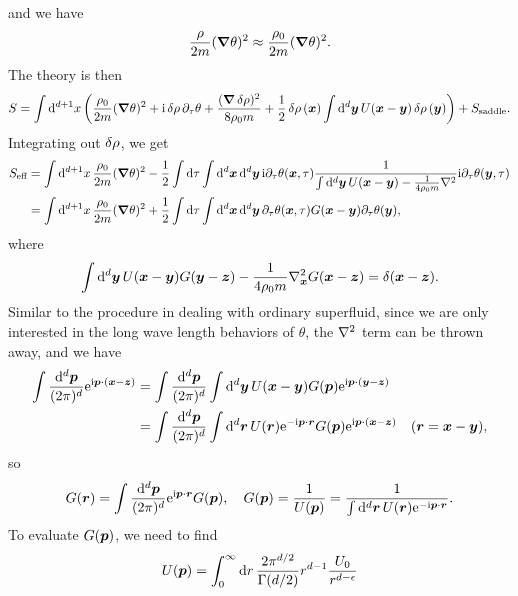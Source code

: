 \documentclass[hyperref, a4paper]{article}
\newcommand*{\ii}{\mathrm{i}}
\newcommand*{\ee}{\mathrm{e}}
\begin{document}
\begin{itemize}
and we have 
\[
    \frac{\rho}{2m} (\grad{\theta})^2 \approx \frac{\rho_0}{2m} (\grad{\theta})^2.
\]
The theory is then 
\begin{equation}
    S = \int \dd[d+1]{x} \left(
        \frac{\rho_0}{2m} (\grad{\theta})^2 
        + \ii \var{\rho} \partial_\tau \theta  
        + \frac{(\grad{\var{\rho}})^2}{8 \rho_0 m} 
        + \frac{1}{2} \var{\rho}(\vb*{x}) \int \dd[d]{\vb*{y}} U(\vb*{x} - \vb*{y}) \var{\rho}(\vb*{y})
    \right) + S_{\text{saddle}}.
\end{equation}
Integrating out $\var{\rho}$, we get 
\begin{equation}
    \begin{aligned}
        S_{\text{eff}} &= \int \dd[d+1]{x} \frac{\rho_0}{2m} (\grad{\theta})^2 
        - \frac{1}{2} \int \dd{\tau} \int \dd[d]{\vb*{x}} \dd[d]{\vb*{y}} 
        \ii \partial_\tau \theta(\vb*{x}, \tau)
            \frac{1}{
                \int \dd[d]{\vb*{y}} U(\vb*{x} - \vb*{y}) - \frac{1}{4 \rho_0 m} \laplacian
            } \ii \partial_\tau \theta (\vb*{y}, \tau) \\
        &= \int \dd[d+1]{x} \frac{\rho_0}{2m} (\grad{\theta})^2 + 
        \frac{1}{2} \int \dd{\tau} \int \dd[d]{\vb*{x}} \dd[d]{\vb*{y}}
        \partial_\tau \theta(\vb*{x}, \tau) G(\vb*{x} - \vb*{y}) \partial_\tau \theta(\vb*{y}),
    \end{aligned}
\end{equation}
where 
\begin{equation}
    \int \dd[d]{\vb*{y}} U(\vb*{x} - \vb*{y}) G(\vb*{y} - \vb*{z}) 
    - \frac{1}{4 \rho_0 m} \laplacian_{\vb*{x}} G(\vb*{x} - \vb*{z})  = \delta(\vb*{x} - \vb*{z}).
\end{equation}
Similar to the procedure in dealing with ordinary superfluid,
since we are only interested in the long wave length behaviors of $\theta$,
the $\laplacian$ term can be thrown away,
and we have 
\[
    \begin{aligned}
        \int \frac{\dd[d]{\vb*{p}}}{(2\pi)^d} \ee^{\ii \vb*{p} \cdot (\vb*{x} - \vb*{z})}
        &= \int \frac{\dd[d]{\vb*{p}}}{(2\pi)^d} \int \dd[d]{\vb*{y}} U(\vb*{x} - \vb*{y}) 
        G(\vb*{p}) \ee^{\ii \vb*{p} \cdot (\vb*{y} - \vb*{z})} \\
        &= \int \frac{\dd[d]{\vb*{p}}}{(2\pi)^d} 
        \int \dd[d]{\vb*{r}} U(\vb*{r}) \ee^{- \ii \vb*{p} \cdot \vb*{r}} 
        G(\vb*{p}) \ee^{\ii \vb*{p} \cdot (\vb*{x} - \vb*{z})} \quad (\vb*{r} = \vb*{x} - \vb*{y}) ,
    \end{aligned}
\]
so 
\begin{equation}
    G(\vb*{r}) = \int \frac{\dd[d]{\vb*{p}}}{(2\pi)^d} \ee^{\ii \vb*{p} \cdot \vb*{r}} G(\vb*{p}), \quad 
    G(\vb*{p}) = \frac{1}{U(\vb*{p})} 
    = \frac{1}{\int \dd[d]{\vb*{r}} U(\vb*{r}) \ee^{- \ii \vb*{p} \cdot \vb*{r}}}.
\end{equation}
To evaluate $G(\vb*{p})$, we need to find 
\begin{equation}
    U(\vb*{p}) = \int_0^\infty \dd{r} \frac{2\pi^{d/2}}{\Gamma(d / 2)} r^{d-1} \frac{U_0}{r^{d - \epsilon}}
\end{equation}

\end{itemize}
\end{document}
